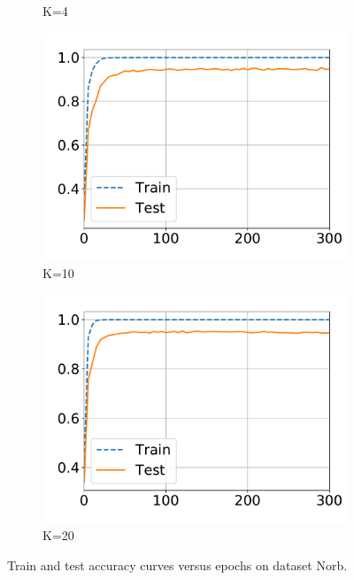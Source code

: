 \begin{figure}[!tp]
\begin{subfigure}{0.31\textwidth}
    \caption{K=4}
  \end{subfigure}
  \centering
  \begin{subfigure}{.31\textwidth}
    \centering
    \includegraphics[width=1\linewidth]{images/supply/train_curves/norb_10.pdf}
    \vspace{-0.8cm}
    \caption{K=10}
  \end{subfigure}
  \centering
  \begin{subfigure}{.31\textwidth}
    \centering
    \includegraphics[width=1\linewidth]{images/supply/train_curves/norb_20.pdf}
    \vspace{-0.8cm}
    \caption{K=20}
  \end{subfigure}
  \caption{Train and test accuracy curves versus epochs on dataset Norb.}
  \label{fig:class-norb}
\end{figure}


